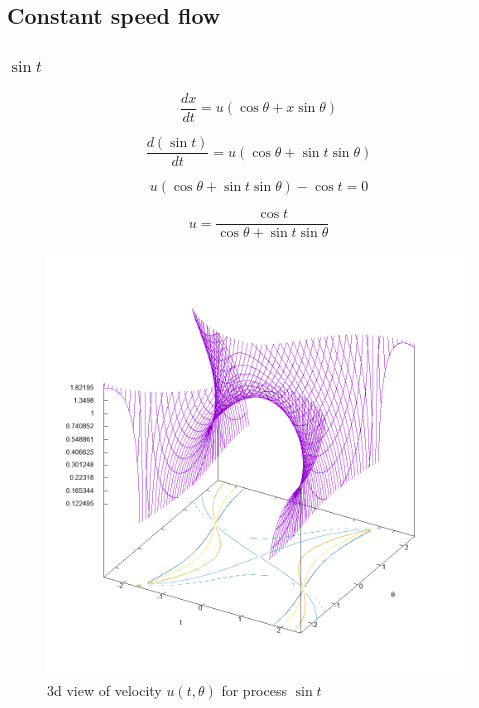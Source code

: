 \documentclass{article}
\begin{document}
\newpage

\subsection{Constant speed flow}\label{sec:csflow}

\subsubsection{$\sin t$}

\begin{equation}
    \frac{dx}{dt} = u (\cos \theta + x \sin \theta)
\end{equation}

\begin{equation}
    \frac{d(\sin t)}{dt} = u(\cos \theta + \sin t \sin \theta)
\end{equation}

\begin{equation}
    u(\cos \theta + \sin t \sin \theta) - \cos t = 0
\end{equation}

\begin{equation}
    u = \frac{\cos t}{\cos \theta + \sin t \sin \theta}
\end{equation}


\begin{figure}[ht]
\centering
\includegraphics[width=5.5in]{plot/sine3d.png}
\caption{3d view of velocity $u(t, \theta)$ for process $\sin t$}
\end{figure}
\end{document}
